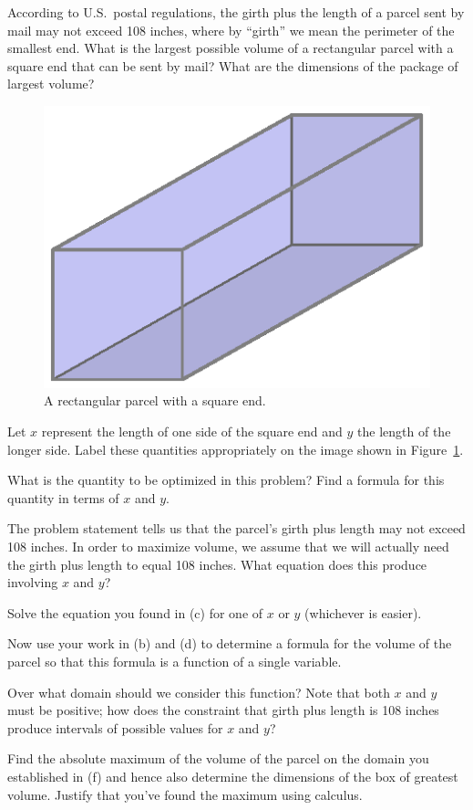 \begin{pa} \label{PA:3.4}
According to U.S.~postal regulations, the girth plus the length of a parcel sent by mail may not exceed 108 inches, where by ``girth'' we mean the perimeter of the smallest end.  What is the largest possible volume of a rectangular parcel with a square end that can be sent by mail?  What are the dimensions of the package of largest volume? 
\begin{figure}[h]
\begin{center}
\includegraphics{figures/3_4_PA1.eps}
\caption{A rectangular parcel with a square end.} \label{F:3.4.PA1}
\end{center}
\end{figure}

\ba
	\item Let $x$ represent the length of one side of the square end and $y$ the length of the longer side.  Label these quantities appropriately on the image shown in Figure~\ref{F:3.4.PA1}.
	\item What is the quantity to be optimized in this problem?  Find a formula for this quantity in terms of $x$ and $y$.
	\item The problem statement tells us that the parcel's girth plus length may not exceed 108 inches.  In order to maximize volume, we assume that we will actually need the girth plus length to equal 108 inches.  What equation does this produce involving $x$ and $y$?
	\item Solve the equation you found in (c) for one of $x$ or $y$ (whichever is easier).
	\item Now use your work in (b) and (d) to determine a formula for the volume of the parcel so that this formula is a function of a single variable.
	\item Over what domain should we consider this function?  Note that both $x$ and $y$ must be positive; how does the constraint that girth plus length is 108 inches produce intervals of possible values for $x$ and $y$?
	\item Find the absolute maximum of the volume of the parcel on the domain you established in (f) and hence also determine the dimensions of the box of greatest volume.  Justify that you've found the maximum using calculus.
\ea
\end{pa} 
\afterpa